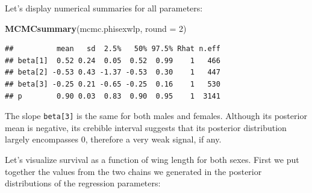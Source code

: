 \documentclass[
  12pt,
]{krantz}
\newenvironment{Shaded}{\begin{snugshade}}{\end{snugshade}}
\newcommand{\AttributeTok}[1]{\textcolor[rgb]{0.13,0.29,0.53}{#1}}
\newcommand{\CommentTok}[1]{\textcolor[rgb]{0.56,0.35,0.01}{\textit{#1}}}
\newcommand{\DecValTok}[1]{\textcolor[rgb]{0.00,0.00,0.81}{#1}}
\newcommand{\FunctionTok}[1]{\textcolor[rgb]{0.13,0.29,0.53}{\textbf{#1}}}
\newcommand{\NormalTok}[1]{#1}
\newcommand{\OtherTok}[1]{\textcolor[rgb]{0.56,0.35,0.01}{#1}}
\newcommand{\SpecialCharTok}[1]{\textcolor[rgb]{0.81,0.36,0.00}{\textbf{#1}}}
\newcommand{\StringTok}[1]{\textcolor[rgb]{0.31,0.60,0.02}{#1}}
\begin{document}
Let's display numerical summaries for all parameters:

\begin{Shaded}
\begin{Highlighting}[]
\FunctionTok{MCMCsummary}\NormalTok{(mcmc.phisexwlp, }\AttributeTok{round =} \DecValTok{2}\NormalTok{)}
\end{Highlighting}
\end{Shaded}

\begin{verbatim}
##          mean   sd  2.5%   50% 97.5% Rhat n.eff
## beta[1]  0.52 0.24  0.05  0.52  0.99    1   466
## beta[2] -0.53 0.43 -1.37 -0.53  0.30    1   447
## beta[3] -0.25 0.21 -0.65 -0.25  0.16    1   530
## p        0.90 0.03  0.83  0.90  0.95    1  3141
\end{verbatim}

The slope \texttt{beta{[}3{]}} is the same for both males and females. Although its posterior mean is negative, its crebible interval suggests that its posterior distribution largely encompasses 0, therefore a very weak signal, if any.

Let's visualize survival as a function of wing length for both sexes. First we put together the values from the two chains we generated in the posterior distributions of the regression parameters:

\begin{Shaded}
\end{Shaded}
\end{document}

